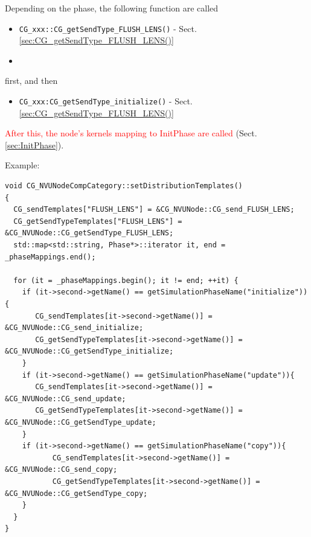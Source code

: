 Depending on the phase, the following function are called
\begin{itemize}
  \item  \verb!CG_xxx::CG_getSendType_FLUSH_LENS()! - Sect.\ref{sec:CG_getSendType_FLUSH_LENS()}
  
  \item 
\end{itemize}
first, and then 
\begin{itemize}
  \item \verb!CG_xxx:CG_getSendType_initialize()! - Sect.\ref{sec:CG_getSendType_FLUSH_LENS()}
\end{itemize}
\textcolor{red}{After this, the node's kernels mapping to InitPhase are called}
(Sect.\ref{sec:InitPhase}).


Example: 
\begin{verbatim}
void CG_NVUNodeCompCategory::setDistributionTemplates()
{
  CG_sendTemplates["FLUSH_LENS"] = &CG_NVUNode::CG_send_FLUSH_LENS;                  
  CG_getSendTypeTemplates["FLUSH_LENS"] = &CG_NVUNode::CG_getSendType_FLUSH_LENS;            
  std::map<std::string, Phase*>::iterator it, end = _phaseMappings.end();                
   
  for (it = _phaseMappings.begin(); it != end; ++it) {                           
    if (it->second->getName() == getSimulationPhaseName("initialize")){                 
       CG_sendTemplates[it->second->getName()] = &CG_NVUNode::CG_send_initialize;               
       CG_getSendTypeTemplates[it->second->getName()] = &CG_NVUNode::CG_getSendType_initialize;         
    }                                               
    if (it->second->getName() == getSimulationPhaseName("update")){                     
       CG_sendTemplates[it->second->getName()] = &CG_NVUNode::CG_send_update;                   
       CG_getSendTypeTemplates[it->second->getName()] = &CG_NVUNode::CG_getSendType_update;             
    }                                               
    if (it->second->getName() == getSimulationPhaseName("copy")){
           CG_sendTemplates[it->second->getName()] = &CG_NVUNode::CG_send_copy;                                 
           CG_getSendTypeTemplates[it->second->getName()] = &CG_NVUNode::CG_getSendType_copy;                   
    }                                                                                                       
  }                                                                                                          
}                  
\end{verbatim}


